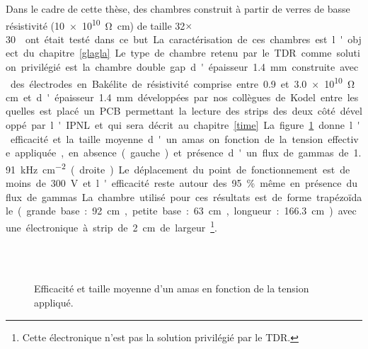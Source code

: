 Dans le cadre de cette thèse, des chambres construit à partir de verres de basse résistivité (\SI{10e10}{\ohm\centi\meter}) de taille \num{32}$\times$\SI{30}{\centi\meter\square} ont était testé dans ce but. La caractérisation de ces chambres est l'object du chapitre \ref{glagla}.


Le type de chambre retenu par le TDR comme solution privilégié est la chambre double gap d'épaisseur \SI{1.4}{\milli\meter} construite avec des électrodes en Bakélite de résistivité comprise entre \num{0.9} et \SI{3.0e10}{\ohm\centi\meter} et d'épaisseur \SI{1.4}{\milli\meter} développées par nos collègues de Kodel entre lesquelles est placé un PCB permettant la lecture des strips des deux côté développé par l'IPNL et qui sera décrit au chapitre \ref{time}. 

La figure \ref{datairpc} donne l'efficacité et la taille moyenne d'un amas on fonction de la tension effective appliquée, en absence (gauche) et présence d'un flux de gammas de \SI{1.91}{\kilo\hertz\per\square\centi\meter} (droite). Le déplacement du point de fonctionnement est de moins de \SI{300}{\volt} et l'efficacité reste autour des \num{95}\% même en présence du flux de gammas. La chambre utilisé pour ces résultats est de forme trapézoïdale (grande base : \SI{92}{\centi\meter}, petite base : \SI{63}{\centi\meter}, longueur : \SI{166.3}{\centi\meter}) avec une électronique à strip de \SI{2}{\centi\meter} de largeur\footnote{Cette électronique n'est pas la solution privilégié par le TDR.}.

\begin{figure}[ht!]
	\centering
	\\
	\\
	\caption{Efficacité et taille moyenne d'un amas en fonction de la tension appliqué.}
	\label{datairpc}
\end{figure}

